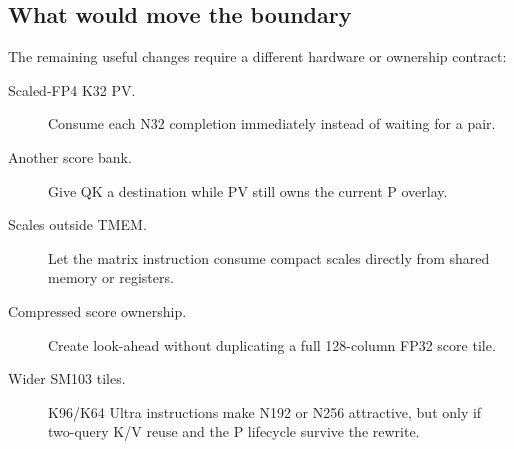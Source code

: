 \subsection{What would move the boundary}

The remaining useful changes require a different hardware or ownership
contract:
\begin{description}
  \item[Scaled-FP4 K32 PV.] Consume each N32 completion immediately instead
  of waiting for a pair.
  \item[Another score bank.] Give QK a destination while PV still owns the
  current P overlay.
  \item[Scales outside TMEM.] Let the matrix instruction consume compact
  scales directly from shared memory or registers.
  \item[Compressed score ownership.] Create look-ahead without duplicating a
  full 128-column FP32 score tile.
  \item[Wider SM103 tiles.] K96/K64 Ultra instructions make N192 or N256
  attractive, but only if two-query K/V reuse and the P lifecycle survive the
  rewrite.
\end{description}
